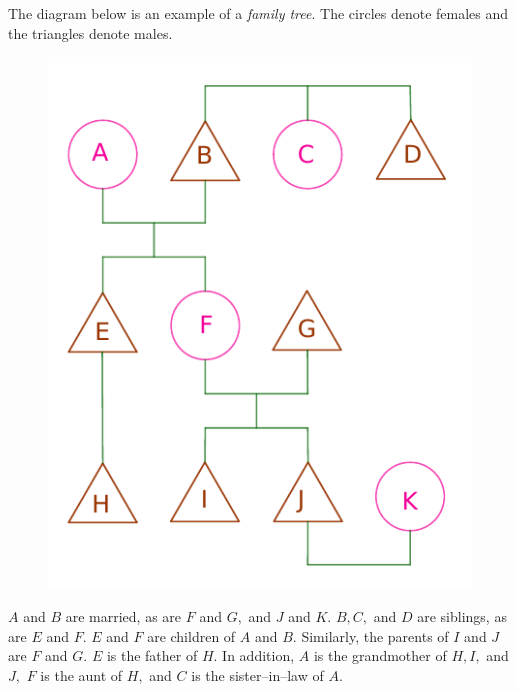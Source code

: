 \begin{multicols}{2}
	The diagram below is an example of a \emph{family tree}. The circles denote females and the triangles denote males.
	\begin{figure}[H]
		\vspace*{-5pt}
		\centering
		\captionsetup{labelformat= empty, justification=centering}
		\includegraphics[width= 0.75\linewidth]{hc-2022-2-3-15-1.pdf}
		\vspace*{-10pt}
	\end{figure}
	$A$ and $B$ are married, as are $F$ and $G,$ and $J$ and $K.$
	\vskip 0.1cm
	$B, C,$ and $D$ are siblings, as are $E$ and $F.$
	$E$ and $F$ are children of $A$ and $B.$
	\vskip 0.1cm
	Similarly, the parents of $I$ and $J$ are $F$ and $G.$
	$E$ is the father of $H.$
	\vskip 0.1cm
	In addition, $A$ is the grandmother of $H, I,$ and $J,$
	$F$ is the aunt of $H,$ and $C$ is the sister--in--law of $A.$
	\begin{figure}[H]
		\vspace*{-5pt}
		\centering
		\captionsetup{labelformat= empty, justification=centering}

\end{figure}
\end{multicols}
